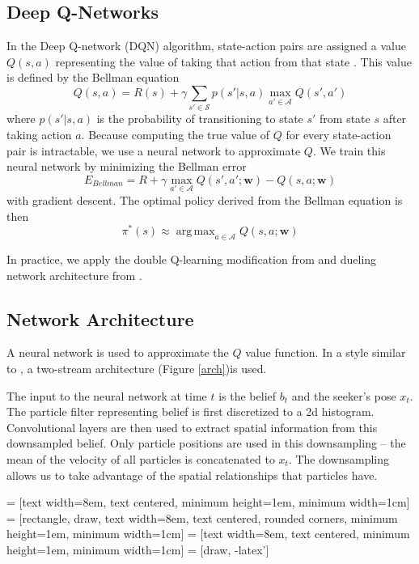 \documentclass[10pt,twocolumn,letterpaper]{article}
\DeclareMathOperator*{\argmax}{arg\,max}
\begin{document}
\subsection{Deep Q-Networks}
In the Deep Q-network (DQN) algorithm, state-action pairs are assigned a value $Q(s, a)$ representing the value of taking that action from that state \cite{dqn}.
This value is defined by the Bellman equation
\begin{equation}
Q(s, a) = R(s) + \gamma\sum_{s' \in \mathcal{S}}p(s' | s, a)\max_{a' \in \mathcal{A}}Q(s', a')
\label{bellman_equation}
\end{equation}
where $p(s' | s, a)$ is the probability of transitioning to state $s'$ from state $s$ after taking action $a$.
Because computing the true value of $Q$ for every state-action pair is intractable, we use a neural network to approximate $Q$.
We train this neural network by minimizing the Bellman error 
\begin{equation}
E_{Bellman} = R + \gamma\max_{a' \in \mathcal{A}}{Q(s', a'; \mathbf{w})} - Q(s, a; \mathbf{w})
\label{bellman_error}
\end{equation}
with gradient descent.
The optimal policy derived from the Bellman equation is then
\begin{equation}
\pi^*(s) \approx \argmax_{a \in \mathcal{A}}{Q(s, a; \mathbf{w})}
\label{bellman_optimal}
\end{equation}

In practice, we apply the double Q-learning modification from \cite{double_dqn} and dueling network architecture from \cite{dueling_dqn}.
\subsection{Network Architecture}
A neural network is used to approximate the $Q$ value function.
In a style similar to \cite{kyle1}, a two-stream architecture (Figure \ref{arch})is used.

The input to the neural network at time $t$ is the belief $b_t$ and the seeker's pose $x_t$.
The particle filter representing belief is first discretized to a 2d histogram.
Convolutional layers are then used to extract spatial information from this downsampled belief.
Only particle positions are used in this downsampling -- the mean of the velocity of all particles is concatenated to $x_t$.
The downsampling allows us to take advantage of the spatial relationships that particles have.

 = [text width=8em, text centered, minimum height=1em, minimum width=1cm]
 = [rectangle, draw, 
    text width=8em, text centered, rounded corners, minimum height=1em, minimum width=1cm]
 = [text width=8em, text centered, minimum height=1em, minimum width=1cm]
 = [draw, -latex']
  
\end{document}
